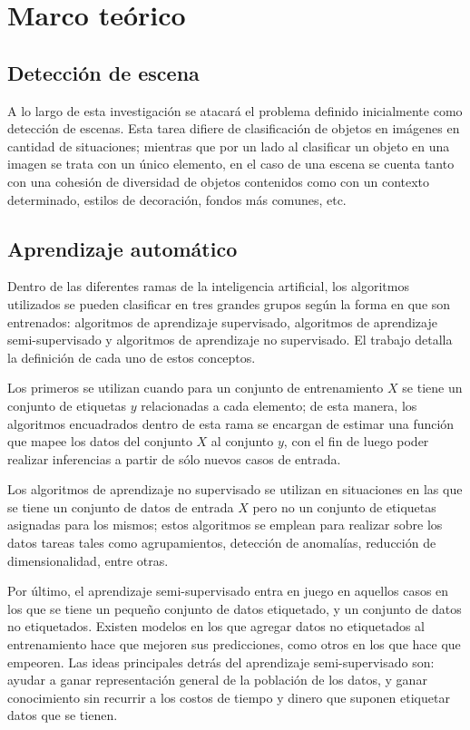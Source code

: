 \section{Marco teórico}\label{sec:marco_teorico}

\subsection{Detección de escena}
A lo largo de esta investigación se atacará el problema definido inicialmente como detección de escenas. Esta tarea difiere de clasificación de objetos en imágenes en cantidad de situaciones; mientras que por un lado al clasificar un objeto en una imagen se trata con un único elemento, en el caso de una escena se cuenta tanto con una cohesión de diversidad de objetos contenidos como con un contexto determinado, estilos de decoración, fondos más comunes, etc.

\subsection{Aprendizaje automático}
 Dentro de las diferentes ramas de la inteligencia artificial, los algoritmos utilizados se pueden clasificar en tres grandes grupos según la forma en que son entrenados: algoritmos de aprendizaje supervisado, algoritmos de aprendizaje semi-supervisado y algoritmos de aprendizaje no supervisado. El trabajo \cite{zhu2009introduction} detalla la definición de cada uno de estos conceptos.
 
  Los primeros se utilizan cuando para un conjunto de entrenamiento \(X\) se tiene un conjunto de etiquetas \(y\) relacionadas a cada elemento; de esta manera, los algoritmos encuadrados dentro de esta rama se encargan de estimar una función que mapee los datos del conjunto \(X\) al conjunto \(y\), con el fin de luego poder realizar inferencias a partir de sólo nuevos casos de entrada.
 
  Los algoritmos de aprendizaje no supervisado se utilizan en situaciones en las que se tiene un conjunto de datos de entrada \(X\) pero no un conjunto de etiquetas asignadas para los mismos; estos algoritmos se emplean para realizar sobre los datos tareas tales como agrupamientos, detección de anomalías, reducción de dimensionalidad, entre otras.
  
  Por último, el aprendizaje semi-supervisado entra en juego en aquellos casos en los que se tiene un pequeño conjunto de datos etiquetado, y un conjunto de datos no etiquetados. Existen modelos en los que agregar datos no etiquetados al entrenamiento hace que mejoren sus predicciones, como otros en los que hace que empeoren. Las ideas principales detrás del aprendizaje semi-supervisado son: ayudar a ganar representación general de la población de los datos, y ganar conocimiento sin recurrir a los costos de tiempo y dinero que suponen etiquetar datos que se tienen.
 
